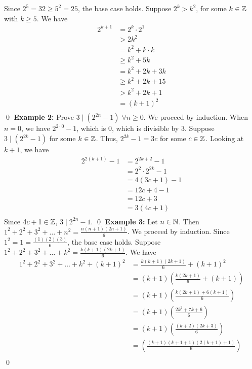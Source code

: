 \documentclass{article}
\begin{document}
\begin{examples}
  Since $2^5 = 32 \geq 5^2 =25$, the base case holds.
  Suppose $2^k > k^2$, for some $k \in \mathbb{Z}$ with $k \geq 5$.
  We have
  \begin{align*}
    2^{k+1} &= 2^k \cdot 2^1\\
    &> 2k^2\\
    &= k^2 + k \cdot k\\
    &\geq k^2 + 5k \tag{$k \geq 5$}\\
    &= k^2 + 2k + 3k\\
    &\geq k^2 + 2k + 15 \tag{$k \geq 5$}\\
    &> k^2 + 2k + 1\\
    &= (k+1)^2\\
  \end{align*}
  \qed\newline
  \textbf{Example 2:}\newline
  Prove $3 \mid (2^{2n} - 1) \; \forall n \geq 0$.
  We proceed by induction.
  When $n = 0$, we have $2^{2 \cdot 0} - 1$, which is $0$, which is divisible by $3$.
  Suppose $3 \mid (2^{2k} - 1)$ for some $k \in \mathbb{Z}$. Thus,  $2^{2k} - 1 = 3c$ for some $c \in \mathbb{Z}$.
  Looking at $k+1$, we have
  \begin{align*}
    2^{2(k+1)}-1 &= 2^{2k+2} - 1\\
    &= 2^2 \cdot 2^{2k} -1\\
    &= 4(3c + 1) - 1\\
    &= 12c + 4 - 1\\
    &= 12c + 3\\
    &= 3(4c+1)\\
  \end{align*}
  Since $4c+1\in \mathbb{Z}$, $3 \mid 2^{2n}-1$.
  \qed\newline
  \textbf{Example 3:}\newline
  Let $n \in \mathbb{N}$. Then $1^2 + 2^2 + 3^2 + \dots + n^2 = \frac{n(n+1)(2n+1)}{6}$.
  We proceed by induction.
  Since $1^2 = 1 = \frac{(1)(2)(3)}{6}$, the base case holds.
  Suppose $1^2 + 2^2 + 3^2 + \dots + k^2 = \frac{k(k+1)(2k+1)}{6}$.
  We have
  \begin{align*}
    1^2 + 2^2 + 3^2 + \dots + k^2 + (k+1)^2 &= \frac{k(k+1)(2k+1)}{6} + (k+1)^2\\
    &= (k+1)\left(\frac{k(2k+1)}{6} + (k+1)\right)\\
    &= (k+1)\left(\frac{k(2k+1) + 6(k+1)}{6}\right)\\
    &= (k+1)\left(\frac{2k^2 + 7k + 6}{6}\right)\\
    &= (k+1)\left(\frac{(k+2)(2k+3)}{6}\right)\\
    &= \left(\frac{(k+1)(k+1+1)(2(k+1)+1)}{6}\right)\\
  \end{align*}
  \qed
\end{examples}
\end{document}
